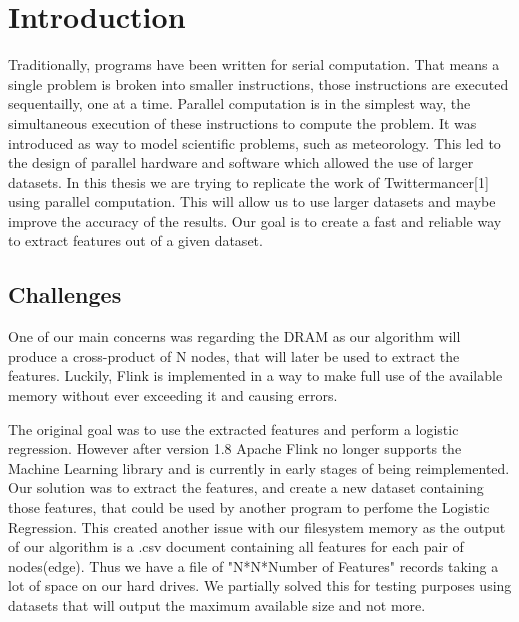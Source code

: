 \chapter{Introduction}


Traditionally, programs have been written for serial computation. That means a single problem is broken into smaller instructions, those instructions are executed sequentailly, one at a time. Parallel computation is in the simplest way, the simultaneous execution of these instructions to compute the problem. It was introduced as way to model scientific problems, such as meteorology. This led to the design of parallel hardware and software which allowed the use of larger datasets. In this thesis we are trying to replicate the work of Twittermancer[1] using parallel computation. This will allow us to use larger datasets and maybe improve the accuracy of the results.
Our goal is to create a fast and reliable way to extract features out of a given dataset.



\section{Challenges}


One of our main concerns was regarding the DRAM as our algorithm will produce a cross-product of N nodes, that will later be used to extract the features. Luckily, Flink is implemented in a way to make full use of the available memory without ever exceeding it and causing errors. 

The original goal was to use the extracted features and perform a logistic regression. However after version 1.8 Apache Flink no longer supports the Machine Learning library and is currently in early stages of being reimplemented. Our solution was to extract the features, and create a new dataset containing those features, that could be used by another program to perfome the Logistic Regression. This created another issue with our filesystem memory as the output of our algorithm is a .csv document containing all features for each pair of nodes(edge). Thus we have a file of "N*N*Number of Features" records taking a lot of space on our hard drives. We partially solved this for testing purposes using datasets that will output the maximum available size and not more.




